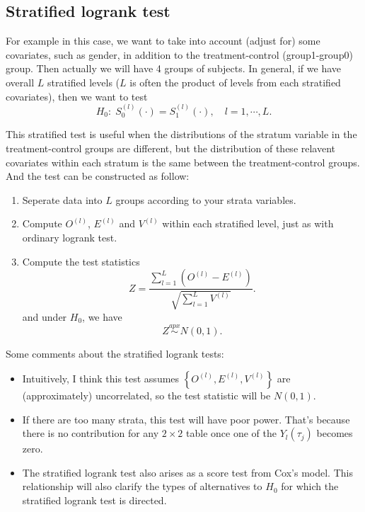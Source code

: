 \documentclass[a4paper,12pt]{article}
\begin{document}
\subsection{Stratified logrank test}
\label{sec:strat-logr-test}

For example in this case, we want to take into account (adjust for) some covariates, such as gender, in addition to the treatment-control (group1-group0) group. Then actually we will have 4 groups of subjects. In general, if we have overall $L$ stratified levels ($L$ is often the product of levels from each stratified covariates), then we want to test
\[
  H_0:\; S_0^{\left(l\right)}\left(\cdot\right) = S_1^{\left(l\right)}\left(\cdot\right)
  ,\quad l = 1, \cdots, L.
\]
\par
This stratified test is useful when the distributions of the stratum variable in the treatment-control groups are different, but the distribution of these relavent covariates within each stratum is the same between the treatment-control groups. And the test can be constructed as follow:

\begin{enumerate}
\item Seperate data into $L$ groups according to your strata variables.
\item Compute $O^{\left(l\right)}$, $E^{\left(l\right)}$ and $V^{\left(l\right)}$ within each stratified level, just as with ordinary logrank test.
\item Compute the test statistics
  \[
    Z = \frac{\sum\limits_{l = 1}^L\left(O^{\left(l\right)} - E^{\left(l\right)}\right)}{
      \sqrt{\sum\limits_{l = 1}^L V^{\left(l\right)}}
    }.
  \]
  and under $H_0$, we have
  \[
    Z \overset{apx}{\sim} N\left(0, 1\right)
    .
  \]
\end{enumerate}

Some comments about the stratified logrank tests:
\begin{itemize}
\item Intuitively, I think this test assumes $\left\{O^{\left(l\right)}, E^{\left(l\right)}, V^{\left(l\right)}\right\}$ are (approximately) uncorrelated, so the test statistic will be $N\left(0, 1\right)$.
\item If there are too many strata, this test will have poor power. That's because there is no contribution for any $2\times2$ table once one of the $Y_l\left(\tau_j\right)$ becomes zero.
\item The stratified logrank test also arises as a score test from Cox's model. This relationship will also clarify the types of alternatives to $H_0$ for which the stratified logrank test is directed.
\end{itemize}
\end{document}
